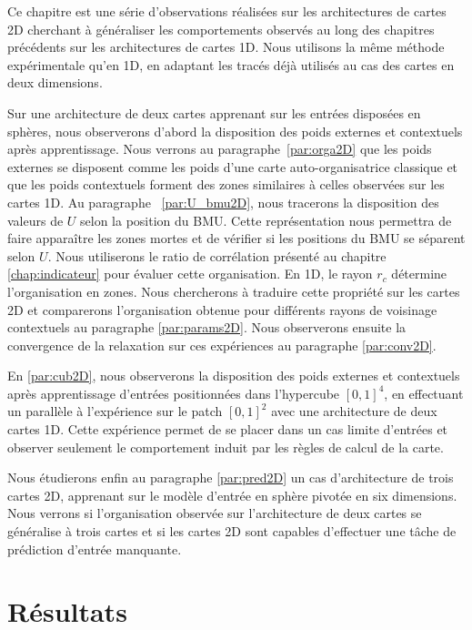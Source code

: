 \documentclass[../main]{subfiles}
\begin{document}
Ce chapitre est une série d'observations réalisées sur les architectures de cartes 2D cherchant à généraliser les comportements observés au long des chapitres précédents sur les architectures de cartes 1D.
Nous utilisons la même méthode expérimentale qu'en 1D, en adaptant les tracés déjà utilisés au cas des cartes en deux dimensions.

Sur une architecture de deux cartes apprenant sur les entrées disposées en sphères, nous observerons d'abord la disposition des poids externes et contextuels après apprentissage. 
Nous verrons au paragraphe~\ref{par:orga2D} que les poids externes se disposent comme les poids d'une carte auto-organisatrice classique et que les poids contextuels forment des zones similaires à celles observées sur les cartes 1D.
Au paragraphe ~\ref{par:U_bmu2D}, nous tracerons la disposition des valeurs de $U$ selon la position du BMU. Cette représentation nous permettra de faire apparaître les zones mortes et de vérifier si les positions du BMU se séparent selon $U$. Nous utiliserons le ratio de corrélation présenté au chapitre \ref{chap:indicateur} pour évaluer cette organisation.
En 1D, le rayon $r_c$ détermine l'organisation en zones. Nous chercherons à traduire cette propriété sur les cartes 2D et comparerons l'organisation obtenue pour différents rayons de voisinage contextuels au paragraphe \ref{par:params2D}.
Nous observerons ensuite la convergence de la relaxation sur ces expériences au paragraphe \ref{par:conv2D}.

En \ref{par:cub2D}, nous observerons la disposition des poids externes et contextuels après apprentissage d'entrées positionnées dans l'hypercube $[0,1]^4$, en effectuant un parallèle à l'expérience sur le patch $[0,1]^2$ avec une architecture de deux cartes 1D. Cette expérience permet de se placer dans un cas limite d'entrées et observer seulement le comportement induit par les règles de calcul de la carte.

Nous étudierons enfin au paragraphe \ref{par:pred2D} un cas d'architecture de trois cartes 2D, apprenant sur le modèle d'entrée en sphère pivotée en six dimensions. Nous verrons si l'organisation observée sur l'architecture de deux cartes se généralise à trois cartes et si les cartes 2D sont capables d'effectuer une tâche de prédiction d'entrée manquante.

\section{Résultats}
\end{document}
